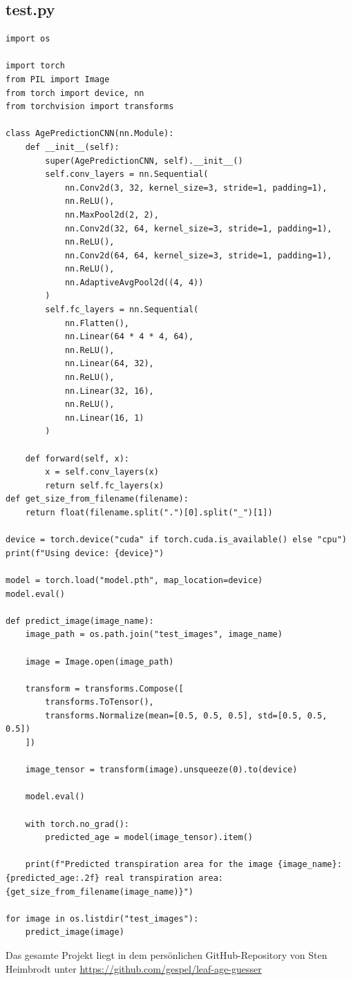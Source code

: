 \subsection{test.py}
\begin{verbatim}
import os

import torch
from PIL import Image
from torch import device, nn
from torchvision import transforms

class AgePredictionCNN(nn.Module):
    def __init__(self):
        super(AgePredictionCNN, self).__init__()
        self.conv_layers = nn.Sequential(
            nn.Conv2d(3, 32, kernel_size=3, stride=1, padding=1),
            nn.ReLU(),
            nn.MaxPool2d(2, 2),
            nn.Conv2d(32, 64, kernel_size=3, stride=1, padding=1),
            nn.ReLU(),
            nn.Conv2d(64, 64, kernel_size=3, stride=1, padding=1),
            nn.ReLU(),
            nn.AdaptiveAvgPool2d((4, 4))
        )
        self.fc_layers = nn.Sequential(
            nn.Flatten(),
            nn.Linear(64 * 4 * 4, 64),
            nn.ReLU(),
            nn.Linear(64, 32),
            nn.ReLU(),
            nn.Linear(32, 16),
            nn.ReLU(),
            nn.Linear(16, 1)
        )

    def forward(self, x):
        x = self.conv_layers(x)
        return self.fc_layers(x)
def get_size_from_filename(filename):
    return float(filename.split(".")[0].split("_")[1])

device = torch.device("cuda" if torch.cuda.is_available() else "cpu")
print(f"Using device: {device}")

model = torch.load("model.pth", map_location=device)
model.eval()

def predict_image(image_name):
    image_path = os.path.join("test_images", image_name)

    image = Image.open(image_path)

    transform = transforms.Compose([
        transforms.ToTensor(),
        transforms.Normalize(mean=[0.5, 0.5, 0.5], std=[0.5, 0.5, 0.5])
    ])

    image_tensor = transform(image).unsqueeze(0).to(device)

    model.eval()

    with torch.no_grad():
        predicted_age = model(image_tensor).item()

    print(f"Predicted transpiration area for the image {image_name}: {predicted_age:.2f} real transpiration area: {get_size_from_filename(image_name)}")

for image in os.listdir("test_images"):
    predict_image(image)
\end{verbatim}
Das gesamte Projekt liegt in dem persönlichen GitHub-Repository von Sten Heimbrodt unter \newline\hyperlink{https://github.com/gespel/leaf-age-guesser}{https://github.com/gespel/leaf-age-guesser}